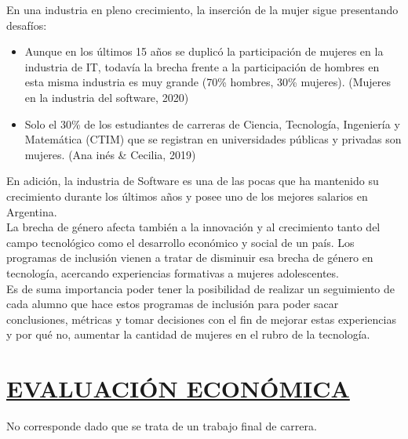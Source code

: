 En una industria en pleno crecimiento, la inserción de la mujer sigue presentando desafíos:
\begin{itemize}
	\item Aunque en los últimos 15 años se duplicó la participación de mujeres en la industria de IT, todavía la brecha frente a la participación de hombres en esta misma industria es muy grande (70\% hombres, 30\% mujeres).  \textbf{\cite{DuplMujeres}}(Mujeres en la industria del software, 2020)
	\item Solo el 30\% de los estudiantes de carreras de Ciencia, Tecnología, Ingeniería y Matemática (CTIM) que se registran en universidades públicas y privadas son mujeres. \textbf{\cite{MujeresCtim}}(Ana inés \& Cecilia, 2019)\\
\end{itemize}

En adición, la industria de Software es una de las pocas que ha mantenido su crecimiento durante los últimos años y posee uno de los mejores salarios en Argentina.\\

La brecha de género afecta también a la innovación y al crecimiento tanto del campo tecnológico como el desarrollo económico y social de un país. Los programas de inclusión vienen a tratar de disminuir esa brecha de género en tecnología, acercando experiencias formativas a mujeres adolescentes.\\

Es de suma importancia poder tener la posibilidad de realizar un seguimiento de cada alumno que hace estos programas de inclusión para poder sacar conclusiones, métricas y tomar decisiones con el fin de mejorar estas experiencias y por qué no, aumentar la cantidad de mujeres en el rubro de la tecnología. \\

\section*{\underline{EVALUACIÓN ECONÓMICA}}
No corresponde dado que se trata de un trabajo final de carrera.
